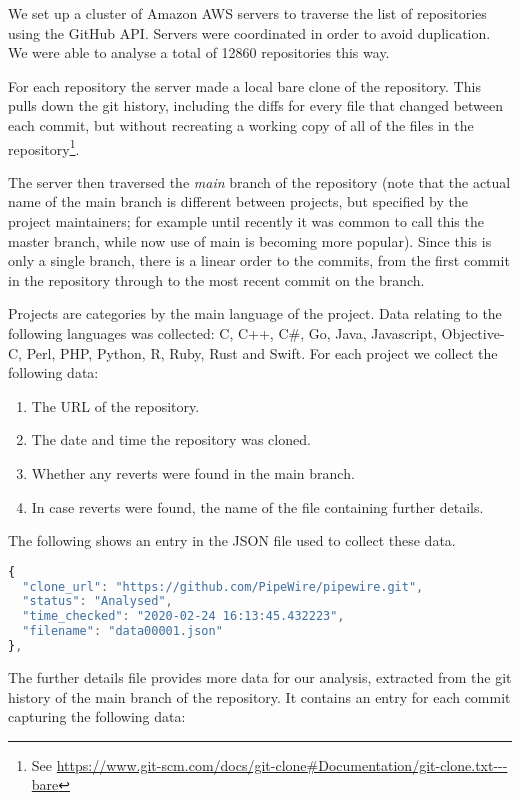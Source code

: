 \documentclass[10pt,journal,compsoc]{IEEEtran}
\begin{document}
We set up a cluster of Amazon AWS servers to traverse the list of repositories using the GitHub API. Servers were coordinated in order to avoid duplication. We were able to analyse a total of 12860 repositories this way.

For each repository the server made a local bare clone of the repository. This pulls down the git history, including the diffs for every file that changed between each commit, but without recreating a working copy of all of the files in the repository\footnote{See \url{https://www.git-scm.com/docs/git-clone#Documentation/git-clone.txt---bare}}.

The server then traversed the {\it main\/} branch of the repository (note that the actual name of the main branch is different between projects, but specified by the project maintainers; for example until recently it was common to call this the {\code master} branch, while now use of {\code main} is becoming more popular). Since this is only a single branch, there is a linear order to the commits, from the first commit in the repository through to the most recent commit on the branch.

Projects are categories by the main language of the project. Data relating to the following languages was collected: C, C++, C\#, Go, Java, Javascript, Objective-C, Perl, PHP, Python, R, Ruby, Rust and Swift. For each project we collect the following data:

\begin{enumerate}
\item The URL of the repository.
\item The date and time the repository was cloned.
\item Whether any reverts were found in the main branch.
\item In case reverts were found, the name of the file containing further details.
\end{enumerate}

The following shows an entry in the JSON file used to collect these data.

\begin{lstlisting}[language=JavaScript]
{
  "clone_url": "https://github.com/PipeWire/pipewire.git",
  "status": "Analysed",
  "time_checked": "2020-02-24 16:13:45.432223",
  "filename": "data00001.json"
},
\end{lstlisting}

The further details file provides more data for our analysis, extracted from the git history of the main branch of the repository. It contains an entry for each commit capturing the following data:
\end{document}
